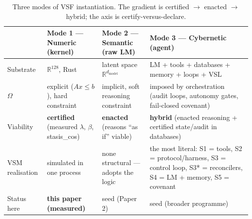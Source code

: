 \documentclass[11pt, a4paper]{article}
\newcommand{\R}{\mathbb{R}}
\begin{document}
\begin{table}[!htb]
\centering
\small
\begin{tabular}{p{2.5cm}p{3.4cm}p{3.4cm}p{3.4cm}}
\toprule
 & \textbf{Mode 1 --- Numeric} (kernel) & \textbf{Mode 2 --- Semantic} (raw LM) & \textbf{Mode 3 --- Cybernetic} (agent) \\
\midrule
Substrate & $\R^{128}$, Rust & latent space $\R^{d_\text{model}}$ & LM + tools + databases + memory + loops + VSL \\
$\Omega$ & explicit ($Ax \le b$), hard constraint & implicit, soft reasoning constraint & imposed by orchestration (audit loops, autonomy gates, fail-closed covenant) \\
Viability & \textbf{certified} (measured $\lambda$, $\beta$, stasis\_cos) & \textbf{enacted} (reasons ``as if'' viable) & \textbf{hybrid} (enacted reasoning + certified state/audit in databases) \\
VSM realisation & simulated in one process & none structural --- adopts the logic & the most literal: S1 = tools, S2 = protocol/harness, S3 = control loop, S3* = reconcilers, S4 = LM + memory, S5 = covenant \\
Status here & \textbf{this paper (measured)} & seed (Paper 2) & seed (broader programme) \\
\bottomrule
\end{tabular}
\caption{Three modes of VSF instantiation. The gradient is
certified $\rightarrow$ enacted $\rightarrow$ hybrid; the axis is
certify-versus-declare.}
\label{tab:three_modes}
\end{table}
\end{document}
